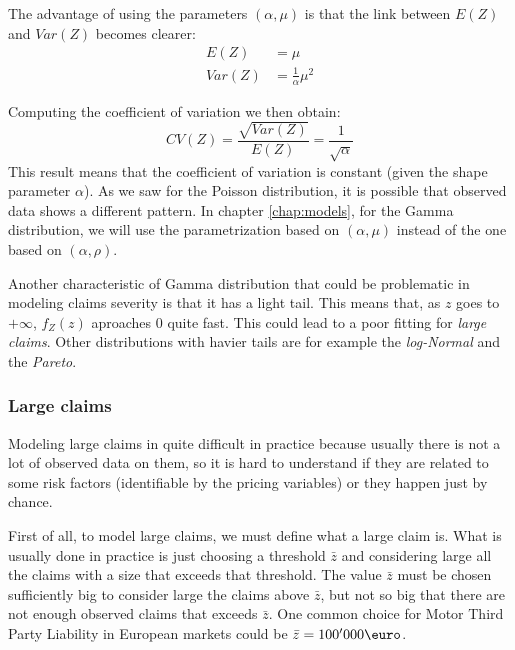 \documentclass[a4paper, nobind]{templates/ociamthesis}
\theoremstyle{definition}
\theoremstyle{definition}
\theoremstyle{definition}
\theoremstyle{remark}
\begin{document}
The advantage of using the parameters \((\alpha, \mu)\) is that the link between \(E(Z)\) and \(Var(Z)\) becomes clearer:
\begin{align*}
E(Z)   & = \mu \\
Var(Z) & = \frac{1}{\alpha}\mu^2
\end{align*}

Computing the coefficient of variation we then obtain:
\[CV(Z) = \frac{\sqrt{Var(Z)}}{E(Z)} = \frac{1}{\sqrt{\alpha}}\]
This result means that the coefficient of variation is constant (given the shape parameter \(\alpha\)). As we saw for the Poisson distribution, it is possible that observed data shows a different pattern. In chapter \ref{chap:models}, for the Gamma distribution, we will use the parametrization based on \((\alpha, \mu)\) instead of the one based on \((\alpha, \rho)\).

Another characteristic of Gamma distribution that could be problematic in modeling claims severity is that it has a light tail. This means that, as \(z\) goes to \(+\infty\), \(f_Z(z)\) aproaches \(0\) quite fast. This could lead to a poor fitting for \emph{large claims}. Other distributions with havier tails are for example the \emph{log-Normal} and the \emph{Pareto}.

\hypertarget{chap:large-claims}{%
\subsubsection{Large claims}\label{chap:large-claims}}

Modeling large claims in quite difficult in practice because usually there is not a lot of observed data on them, so it is hard to understand if they are related to some risk factors (identifiable by the pricing variables) or they happen just by chance.

First of all, to model large claims, we must define what a large claim is. What is usually done in practice is just choosing a threshold \(\bar{z}\) and considering large all the claims with a size that exceeds that threshold. The value \(\bar{z}\) must be chosen sufficiently big to consider large the claims above \(\bar{z}\), but not so big that there are not enough observed claims that exceeds \(\bar{z}\). One common choice for Motor Third Party Liability in European markets could be \(\bar{z} = 100' 000 \text{\euro}\).
\end{document}
